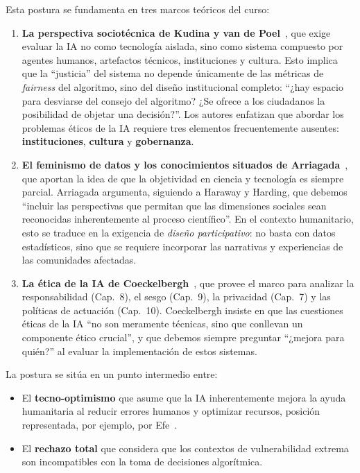 \documentclass[12pt, a4paper]{article}
\begin{document}
Esta postura se fundamenta en tres marcos teóricos del curso:

\begin{enumerate}[leftmargin=2em]
    \item \textbf{La perspectiva sociotécnica de Kudina y van de Poel}~\cite{kudina2024sociotechnical}, que exige evaluar la IA no como tecnología aislada, sino como sistema compuesto por agentes humanos, artefactos técnicos, instituciones y cultura. Esto implica que la ``justicia'' del sistema no depende únicamente de las métricas de \textit{fairness} del algoritmo, sino del diseño institucional completo: ``¿hay espacio para desviarse del consejo del algoritmo? ¿Se ofrece a los ciudadanos la posibilidad de objetar una decisión?''. Los autores enfatizan que abordar los problemas éticos de la IA requiere tres elementos frecuentemente ausentes: \textbf{instituciones}, \textbf{cultura} y \textbf{gobernanza}.

    \item \textbf{El feminismo de datos y los conocimientos situados de Arriagada}~\cite{arriagada2024sesgos}, que aportan la idea de que la objetividad en ciencia y tecnología es siempre parcial. Arriagada argumenta, siguiendo a Haraway y Harding, que debemos ``incluir las perspectivas que permitan que las dimensiones sociales sean reconocidas inherentemente al proceso científico''. En el contexto humanitario, esto se traduce en la exigencia de \textit{diseño participativo}: no basta con datos estadísticos, sino que se requiere incorporar las narrativas y experiencias de las comunidades afectadas.

    \item \textbf{La ética de la IA de Coeckelbergh}~\cite{coeckelbergh2021etica}, que provee el marco para analizar la responsabilidad (Cap.~8), el sesgo (Cap.~9), la privacidad (Cap.~7) y las políticas de actuación (Cap.~10). Coeckelbergh insiste en que las cuestiones éticas de la IA ``no son meramente técnicas, sino que conllevan un componente ético crucial'', y que debemos siempre preguntar ``¿mejora para quién?'' al evaluar la implementación de estos sistemas.
\end{enumerate}

La postura se sitúa en un punto intermedio entre:

\begin{itemize}[leftmargin=2em]
    \item El \textbf{tecno-optimismo} que asume que la IA inherentemente mejora la ayuda humanitaria al reducir errores humanos y optimizar recursos, posición representada, por ejemplo, por Efe~\cite{efe2022review}.
    \item El \textbf{rechazo total} que considera que los contextos de vulnerabilidad extrema son incompatibles con la toma de decisiones algorítmica.
\end{itemize}
\end{document}

